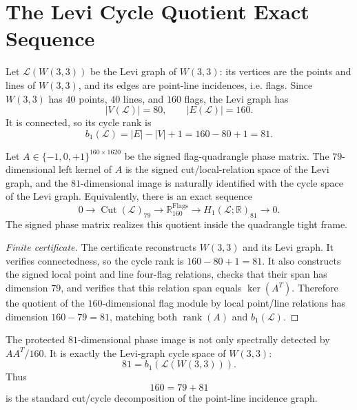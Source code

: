 
\section{The Levi Cycle Quotient Exact Sequence}
\label{sec:levi-cycle-quotient-exact-sequence}

Let $\mathcal L(W(3,3))$ be the Levi graph of $W(3,3)$: its vertices are the
points and lines of $W(3,3)$, and its edges are point-line incidences, i.e. flags.
Since $W(3,3)$ has $40$ points, $40$ lines, and $160$ flags, the Levi graph has
\[
        |V(\mathcal L)|=80,
        \qquad
        |E(\mathcal L)|=160.
\]
It is connected, so its cycle rank is
\[
        b_1(\mathcal L)=|E|-|V|+1=160-80+1=81.
\]

\begin{theorem}
Let $A\in\{-1,0,+1\}^{160\times1620}$ be the signed flag-quadrangle phase matrix.
The $79$-dimensional left kernel of $A$ is the signed cut/local-relation space of
the Levi graph, and the $81$-dimensional image is naturally identified with the
cycle space of the Levi graph.  Equivalently, there is an exact sequence
\[
        0\longrightarrow \operatorname{Cut}(\mathcal L)_{79}
        \longrightarrow \mathbb R^{\mathrm{Flags}}_{160}
        \longrightarrow H_1(\mathcal L;\mathbb R)_{81}
        \longrightarrow 0.
\]
The signed phase matrix realizes this quotient inside the quadrangle tight frame.
\end{theorem}

\begin{proof}[Finite certificate]
The certificate reconstructs $W(3,3)$ and its Levi graph.  It verifies connectedness,
so the cycle rank is $160-80+1=81$.  It also constructs the signed local point and
line four-flag relations, checks that their span has dimension $79$, and verifies that
this relation span equals $\ker(A^T)$.  Therefore the quotient of the $160$-dimensional
flag module by local point/line relations has dimension $160-79=81$, matching both
$\operatorname{rank}(A)$ and $b_1(\mathcal L)$.
\end{proof}

\begin{corollary}
The protected $81$-dimensional phase image is not only spectrally detected by
$AA^T/160$.  It is exactly the Levi-graph cycle space of $W(3,3)$:
\[
        81=b_1(\mathcal L(W(3,3))).
\]
Thus
\[
        160=79+81
\]
is the standard cut/cycle decomposition of the point-line incidence graph.
\end{corollary}
